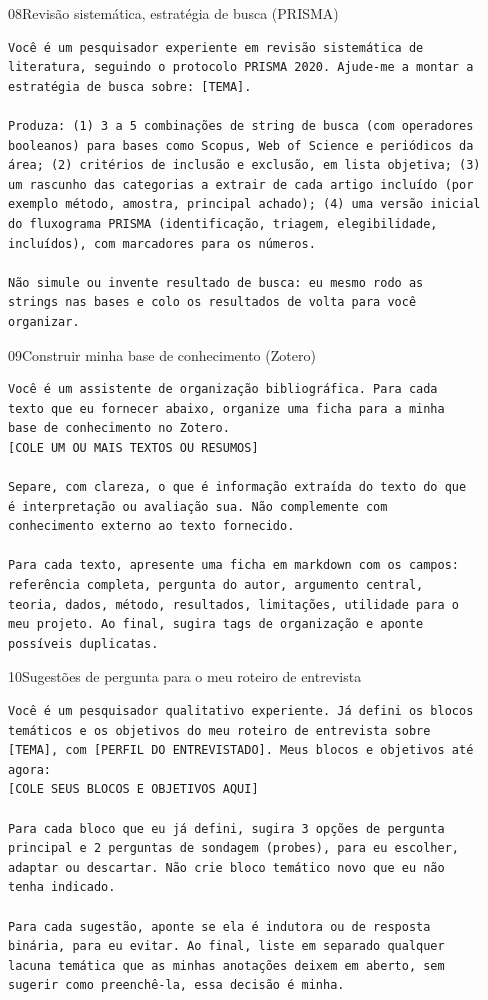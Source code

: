 \documentclass[11pt,a4paper]{article}
\begin{document}
\begin{modelo}{08}{Revisão sistemática, estratégia de busca (PRISMA)}
\begin{lstlisting}
Você é um pesquisador experiente em revisão sistemática de
literatura, seguindo o protocolo PRISMA 2020. Ajude-me a montar a
estratégia de busca sobre: [TEMA].

Produza: (1) 3 a 5 combinações de string de busca (com operadores
booleanos) para bases como Scopus, Web of Science e periódicos da
área; (2) critérios de inclusão e exclusão, em lista objetiva; (3)
um rascunho das categorias a extrair de cada artigo incluído (por
exemplo método, amostra, principal achado); (4) uma versão inicial
do fluxograma PRISMA (identificação, triagem, elegibilidade,
incluídos), com marcadores para os números.

Não simule ou invente resultado de busca: eu mesmo rodo as
strings nas bases e colo os resultados de volta para você
organizar.
\end{lstlisting}
\end{modelo}

\begin{modelo}{09}{Construir minha base de conhecimento (Zotero)}
\begin{lstlisting}
Você é um assistente de organização bibliográfica. Para cada
texto que eu fornecer abaixo, organize uma ficha para a minha
base de conhecimento no Zotero.
[COLE UM OU MAIS TEXTOS OU RESUMOS]

Separe, com clareza, o que é informação extraída do texto do que
é interpretação ou avaliação sua. Não complemente com
conhecimento externo ao texto fornecido.

Para cada texto, apresente uma ficha em markdown com os campos:
referência completa, pergunta do autor, argumento central,
teoria, dados, método, resultados, limitações, utilidade para o
meu projeto. Ao final, sugira tags de organização e aponte
possíveis duplicatas.
\end{lstlisting}
\end{modelo}

\begin{modelo}{10}{Sugestões de pergunta para o meu roteiro de entrevista}
\begin{lstlisting}
Você é um pesquisador qualitativo experiente. Já defini os blocos
temáticos e os objetivos do meu roteiro de entrevista sobre
[TEMA], com [PERFIL DO ENTREVISTADO]. Meus blocos e objetivos até
agora:
[COLE SEUS BLOCOS E OBJETIVOS AQUI]

Para cada bloco que eu já defini, sugira 3 opções de pergunta
principal e 2 perguntas de sondagem (probes), para eu escolher,
adaptar ou descartar. Não crie bloco temático novo que eu não
tenha indicado.

Para cada sugestão, aponte se ela é indutora ou de resposta
binária, para eu evitar. Ao final, liste em separado qualquer
lacuna temática que as minhas anotações deixem em aberto, sem
sugerir como preenchê-la, essa decisão é minha.
\end{lstlisting}
\end{modelo}
\end{document}
